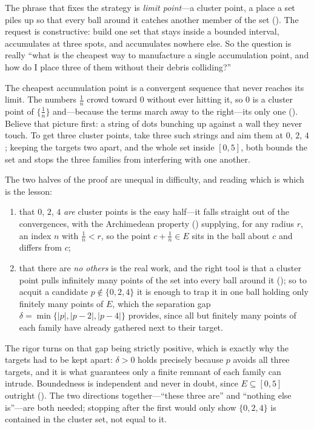 \documentclass[main.tex]{subfiles}
\begin{document}
\begin{Reflection}
The phrase that fixes the strategy is \emph{limit point}---a cluster point, a place a set piles up so that
every ball around it catches another member of the set (). The request is constructive: build
one set that stays inside a bounded interval, accumulates at three spots, and accumulates nowhere else. So
the question is really ``what is the cheapest way to manufacture a single accumulation point, and how do I
place three of them without their debris colliding?''

The cheapest accumulation point is a convergent sequence that never reaches its limit. The numbers $\tfrac1n$
crowd toward $0$ without ever hitting it, so $0$ is a cluster point of $\{\tfrac1n\}$ and---because the terms
march away to the right---its only one (). Believe that picture first: a string of dots
bunching up against a wall they never touch. To get three cluster points, take three such strings and aim
them at $0$, $2$, $4$; keeping the targets two apart, and the whole set inside $[0,5]$, both bounds the set
and stops the three families from interfering with one another.

The two halves of the proof are unequal in difficulty, and reading which is which is the lesson:
\begin{enumerate}[leftmargin=1.7em,itemsep=3pt,topsep=2pt,label=\textnormal{(\arabic*)}]
  \item that $0$, $2$, $4$ \emph{are} cluster points is the easy half---it falls straight out of the
        convergences, with the Archimedean property () supplying, for any
        radius $r$, an index $n$ with $\tfrac1n<r$, so the point $c+\tfrac1n\in E$ sits in the ball about $c$
        and differs from $c$;
  \item that there are \emph{no others} is the real work, and the right tool is that a cluster point pulls
        infinitely many points of the set into every ball around it (); so to acquit a candidate $p\notin\{0,2,4\}$ it is enough to
        trap it in one ball holding only finitely many points of $E$, which the separation gap
        $\delta=\min\{|p|,|p-2|,|p-4|\}$ provides, since all but finitely many points of each family have
        already gathered next to their target.
\end{enumerate}

The rigor turns on that gap being strictly positive, which is exactly why the targets had to be kept apart:
$\delta>0$ holds precisely because $p$ avoids all three targets, and it is what guarantees only a finite
remnant of each family can intrude. Boundedness is independent and never in doubt, since $E\subseteq[0,5]$
outright (). The two directions together---``these three are'' and ``nothing else is''---are
both needed; stopping after the first would only show $\{0,2,4\}$ is contained in the cluster set, not equal
to it.


\end{Reflection}
\end{document}
